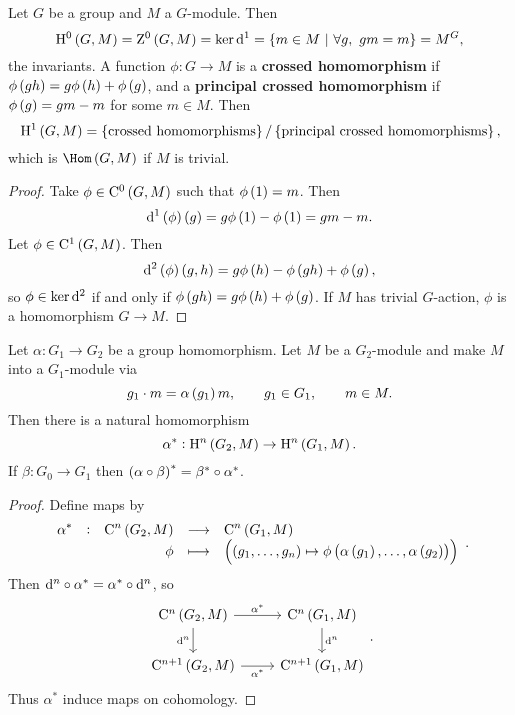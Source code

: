 
\begin{corollary}
Let $ G $ be a group and $ M $ a $ G $-module. Then
$$ \H^0\br{G, M} = \Z^0\br{G, M} = \ker \d^1 = \cbr{m \in M \st \forall g, \ gm = m} = M^G, $$
the invariants. A function $ \phi : G \to M $ is a \textbf{crossed homomorphism} if $ \phi\br{gh} = g\phi\br{h} + \phi\br{g} $, and a \textbf{principal crossed homomorphism} if $ \phi\br{g} = gm - m $ for some $ m \in M $. Then
$$ \H^1\br{G, M} = \cbr{\text{crossed homomorphisms}} / \cbr{\text{principal crossed homomorphisms}}, $$
which is $ \Hom\br{G, M} $ if $ M $ is trivial.
\end{corollary}

\begin{proof}
Take $ \phi \in \C^0\br{G, M} $ such that $ \phi\br{1} = m $. Then
$$ \d^1\br{\phi}\br{g} = g\phi\br{1} - \phi\br{1} = gm - m. $$
Let $ \phi \in \C^1\br{G, M} $. Then
$$ \d^2\br{\phi}\br{g, h} = g\phi\br{h} - \phi\br{gh} + \phi\br{g}, $$
so $ \phi \in \ker \mathrm{d}^2 $ if and only if $ \phi\br{gh} = g\phi\br{h} + \phi\br{g} $. If $ M $ has trivial $ G $-action, $ \phi $ is a homomorphism $ G \to M $.
\end{proof}

\begin{proposition}
Let $ \alpha : G_1 \to G_2 $ be a group homomorphism. Let $ M $ be a $ G_2 $-module and make $ M $ into a $ G_1 $-module via
$$ g_1 \cdot m = \alpha\br{g_1}m, \qquad g_1 \in G_1, \qquad m \in M. $$
Then there is a natural homomorphism
$$ \alpha^* : \H^n\br{G_2, M} \to \H^n\br{G_1, M}. $$
If $ \beta : G_0 \to G_1 $ then $ \br{\alpha \circ \beta}^* = \beta^* \circ \alpha^* $.
\end{proposition}

\begin{proof}
Define maps by
$$ \function[\alpha^*]{\C^n\br{G_2, M}}{\C^n\br{G_1, M}}{\phi}{\br{\br{g_1, \dots, g_n} \mapsto \phi\br{\alpha\br{g_1}, \dots, \alpha\br{g_2}}}}. $$
Then $ \mathrm{d}^n \circ \alpha^* = \alpha^* \circ \mathrm{d}^n $, so
$$
\begin{tikzcd}
\C^n\br{G_2, M} \arrow{r}{\alpha^*} \arrow{d}[swap]{\d^n} & \C^n\br{G_1, M} \arrow{d}{\d^n} \\
\C^{n + 1}\br{G_2, M} \arrow{r}[swap]{\alpha^*} & \C^{n + 1}\br{G_1, M}
\end{tikzcd}.
$$
Thus $ \alpha^* $ induce maps on cohomology.
\end{proof}

\pagebreak

